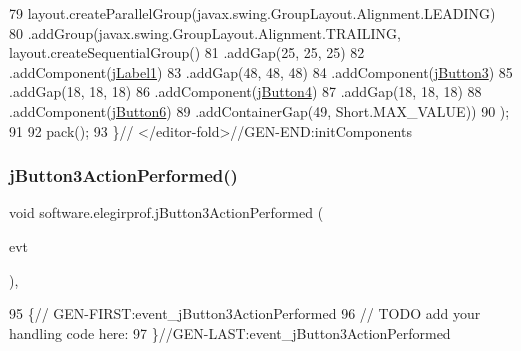 \begin{DoxyCode}
79             layout.createParallelGroup(javax.swing.GroupLayout.Alignment.LEADING)
80             .addGroup(javax.swing.GroupLayout.Alignment.TRAILING, layout.createSequentialGroup()
81                 .addGap(25, 25, 25)
82                 .addComponent(\mbox{\hyperlink{classsoftware_1_1elegirprof_a922b779cc2161f5cc8f9f4bff21fb1db}{jLabel1}})
83                 .addGap(48, 48, 48)
84                 .addComponent(\mbox{\hyperlink{classsoftware_1_1elegirprof_af66925a660384d3f86f5cb3459c9acd0}{jButton3}})
85                 .addGap(18, 18, 18)
86                 .addComponent(\mbox{\hyperlink{classsoftware_1_1elegirprof_a9b56596496adced58249f364ee8944b2}{jButton4}})
87                 .addGap(18, 18, 18)
88                 .addComponent(\mbox{\hyperlink{classsoftware_1_1elegirprof_a230246a01ebe054fe6b990811ba3c403}{jButton6}})
89                 .addContainerGap(49, Short.MAX\_VALUE))
90         );
91 
92         pack();
93     \}\textcolor{comment}{// </editor-fold>//GEN-END:initComponents}
\end{DoxyCode}
\mbox{\label{classsoftware_1_1elegirprof_a4e181a30f97bb3098d2c1c9ef3fb26a4}} 
\subsubsection{\texorpdfstring{j\+Button3\+Action\+Performed()}{jButton3ActionPerformed()}}
{\footnotesize\ttfamily void software.\+elegirprof.\+j\+Button3\+Action\+Performed (\begin{DoxyParamCaption}\item[{java.\+awt.\+event.\+Action\+Event}]{evt }\end{DoxyParamCaption})\hspace{0.3cm}{\ttfamily [inline]}, {\ttfamily [private]}}


\begin{DoxyCode}
95                                                                          \{\textcolor{comment}{//
      GEN-FIRST:event\_jButton3ActionPerformed}
96         \textcolor{comment}{// TODO add your handling code here:}
97     \}\textcolor{comment}{//GEN-LAST:event\_jButton3ActionPerformed}
\end{DoxyCode}
\mbox{\label{classsoftware_1_1elegirprof_a321037ccc1de9fd2bebbfe84eed2d536}} 
